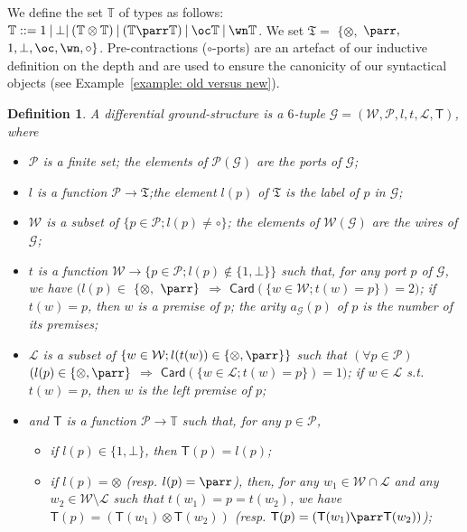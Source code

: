 \documentclass{article}
\theoremstyle{plain}
\newtheorem{definition}{Definition}
\newcommand{\typesoflinks}{\mathfrak{T}}
\newcommand{\tens}{\otimes}
\newcommand{\one}{1}
\newcommand{\bottom}{\bot}
\newcommand{\cod}{\oc}
\newcommand{\contr}{\wn}
\newcommand{\arity}[1]{{\textit{a}}_{#1}}
\newcommand{\ports}[1]{\mathcal{P}(#1)}
\newcommand{\Card}[1]{\textsf{Card}\left( #1 \right)}
\newcommand{\wires}[1]{\mathcal{W}(#1)}
\begin{document}
We define the set $\mathbb{T}$ of types as follows: $\mathbb{T} ::= \one \: \vert \: \bot \vert \: (\mathbb{T} \tens \mathbb{T}) \: \vert \: (\mathbb{T} \parr \mathbb{T}) \: \vert \: \cod \mathbb{T} \: \vert \: \contr \mathbb{T}$. We set $\typesoflinks = $ $\{ \tens, $ $\parr, $ $\one, \bottom, \cod, \contr, \circ \}$. Pre-contractions ($\circ$-ports) are an artefact of our inductive definition on the depth and are used to ensure the canonicity of our syntactical objects (see Example~\ref{example: old versus new}).


\begin{definition}\label{defin: diff ground-structure}
A \emph{differential ground-structure} is a $6$-tuple $\mathcal{G} = (\mathcal{W}, \mathcal{P}, l, t, \mathcal{L}, \textsf{T})$, where
\begin{itemize}
\item $\mathcal{P}$ is a finite set; the elements of $\ports{\mathcal{G}}$ are the \emph{ports of $\mathcal{G}$};
\item $l$ is a function $\mathcal{P} \to \typesoflinks$;the element $l(p)$ of $\typesoflinks$ is the \emph{label of $p$ in $\mathcal{G}$};
\item $\mathcal{W}$ is a subset of $\{ p \in \mathcal{P} ; l(p) \not= \circ \}$; the elements of $\wires{\mathcal{G}}$ are the \emph{wires of $\mathcal{G}$};
\item $t$ is a function $\mathcal{W} \to \{ p \in \mathcal{P} ; l(p) \notin \{ \one, \bottom \} \}$ such that, for any port $p$ of $\mathcal{G}$, we have $(l(p) \in$ $\{ \tens, $ $\parr \}$ $\Rightarrow$ $\Card{\{ w \in \mathcal{W} ; t(w) = p \}} = 2)$; 
if $t(w) = p$, then $w$ is a \emph{premise of $p$}; the \emph{arity $\arity{\mathcal{G}}(p)$ of $p$} is the number of its premises;
\item $\mathcal{L}$ is a subset of $\{ w \in \mathcal{W}; l(t(w)) \in \{ \tens, \parr \} \}$ such that $(\forall p \in \mathcal{P})$ $(l(p) \in \{ \tens, \parr \}$ $\Rightarrow$ $\Card{{\{ w \in \mathcal{L} ; t(w) = p \}}} = 1)$; if $w \in \mathcal{L}$ s.t. $t(w) = p$, then $w$ is \emph{the left premise of $p$;}
\item and $\textsf{T}$ is a function $\mathcal{P} \to \mathbb{T}$ such that, for any $p \in \mathcal{P}$,
\begin{itemize}
\item if $l(p) \in \{ \one, \bottom \}$, then $\textsf{T}(p) = l(p)$;
\item if $l(p) = \tens$ (resp. $l(p) = \parr$), then, for any $w_1 \in \mathcal{W} \cap \mathcal{L}$ and any $w_2 \in \mathcal{W} \setminus \mathcal{L}$ such that $t(w_1) = p = t(w_2)$, we have $\textsf{T}(p) = (\textsf{T}(w_1) \tens \textsf{T}(w_2))$ (resp. $\textsf{T}(p) = (\textsf{T}(w_1) \parr \textsf{T}(w_2))$);

\end{itemize}
\end{itemize}
\end{definition}
\end{document}
